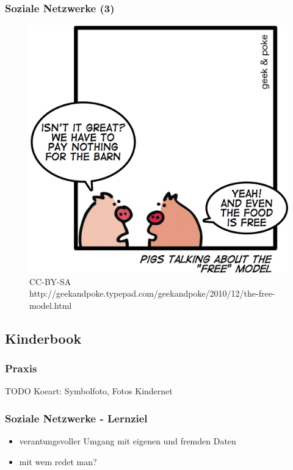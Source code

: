 \documentclass{beamer}
\begin{document}
\begin{frame}
  \frametitle{Soziale Netzwerke (3)}
  \begin{figure}
    \includegraphics[height=0.6\textheight]{img/business_pigs.jpg}
    \caption{CC-BY-SA http://geekandpoke.typepad.com/geekandpoke/2010/12/the-free-model.html}
  \end{figure}
\end{frame}

\subsection{Kinderbook}

\begin{frame}
  \frametitle{Praxis}
  TODO Koeart: Symbolfoto, Fotos Kindernet
\end{frame}

\begin{frame}
  \frametitle{Soziale Netzwerke - Lernziel}
  \begin{itemize}
    \item<2-> verantungsvoller Umgang mit eigenen und fremden Daten
    \item<3-> mit wem redet man?
  \end{itemize}
\end{frame}
\end{document}

